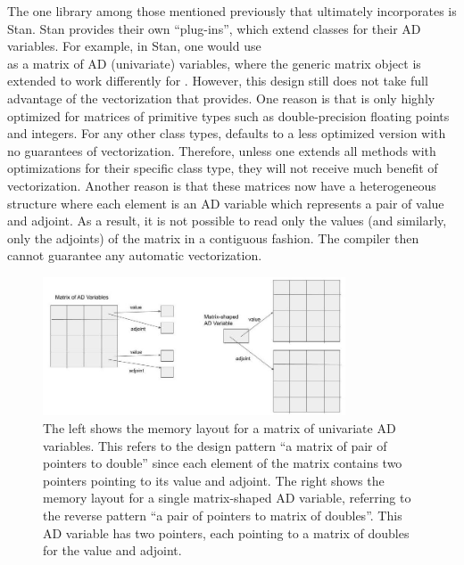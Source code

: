 The one library among those mentioned previously that ultimately incorporates  is Stan.
Stan provides their own ``plug-ins'', which extend  classes for their AD variables.
For example, in Stan, one would use \\
 as a matrix of AD (univariate) variables,
where the generic matrix object is extended to work differently for .
However, this design still does not take full advantage of the vectorization that  provides.
One reason is that  is only highly optimized for matrices of primitive types such as double-precision floating points and integers.
For any other class types,  defaults to a less optimized version with no guarantees of vectorization.
Therefore, unless one extends all  methods with optimizations for their specific class type,
they will not receive much benefit of vectorization.
Another reason is that these matrices now have a heterogeneous structure where
each element is an AD variable which represents a pair of value and adjoint.
As a result, it is not possible to read only the values (and similarly, only the adjoints) of the matrix in a contiguous fashion.
The compiler then cannot guarantee any automatic vectorization.

\begin{figure}[t]
    \centering
    \includegraphics[width=0.8\textwidth]{fastad/figs/matrix-memory-layout.jpg}
    \caption{%
        The left shows the memory layout for a matrix of univariate AD variables.
        This refers to the design pattern ``a matrix of pair of pointers to double''
        since each element of the matrix contains two pointers pointing to its value and adjoint.
        The right shows the memory layout for a single matrix-shaped AD variable,
        referring to the reverse pattern ``a pair of pointers to matrix of doubles''.
        This AD variable has two pointers, each pointing to a matrix of doubles for the value and adjoint.
    }\label{fig:matrix-memory-layout}
\end{figure}

